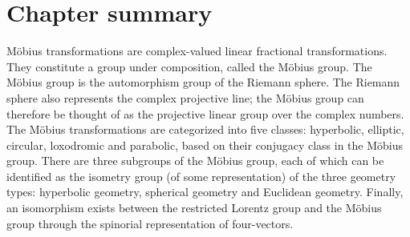 \section*{Chapter summary}
Möbius transformations are complex-valued linear fractional transformations. They constitute a group under composition, called the Möbius group. The Möbius group is the automorphism group of the Riemann sphere. The Riemann sphere also represents the complex projective line; the Möbius group can therefore be thought of as the projective linear group over the complex numbers. The Möbius transformations are categorized into five classes: hyperbolic, elliptic, circular, loxodromic and parabolic, based on their conjugacy class in the Möbius group. There are three subgroups of the Möbius group, each of which can be identified as the isometry group (of some representation) of the three geometry types: hyperbolic geometry, spherical geometry and Euclidean geometry. Finally, an isomorphism exists between the restricted Lorentz group and the Möbius group through the spinorial representation of four-vectors.